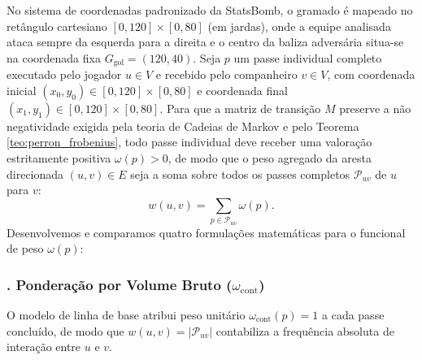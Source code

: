 \documentclass[10pt,a4paper]{article}
\theoremstyle{definition}
\theoremstyle{plain}
\theoremstyle{remark}
\begin{document}
No sistema de coordenadas padronizado da StatsBomb, o gramado é mapeado no retângulo cartesiano $[0, 120] \times [0, 80]$ (em jardas), onde a equipe analisada ataca sempre da esquerda para a direita e o centro da baliza adversária situa-se na coordenada fixa $G_{\text{gol}} = (120, 40)$. Seja $p$ um passe individual completo executado pelo jogador $u \in V$ e recebido pelo companheiro $v \in V$, com coordenada inicial $(x_0, y_0) \in [0, 120] \times [0, 80]$ e coordenada final $(x_1, y_1) \in [0, 120] \times [0, 80]$. Para que a matriz de transição $M$ preserve a não negatividade exigida pela teoria de Cadeias de Markov e pelo Teorema \ref{teo:perron_frobenius}, todo passe individual deve receber uma valoração estritamente positiva $\omega(p) > 0$, de modo que o peso agregado da aresta direcionada $(u, v) \in E$ seja a soma sobre todos os passes completos $\mathcal{P}_{uv}$ de $u$ para $v$:
\begin{equation}
w(u, v) = \sum_{p \in \mathcal{P}_{uv}} \omega(p).
\label{eq:soma_arestas}
\end{equation}
Desenvolvemos e comparamos quatro formulações matemáticas para o funcional de peso $\omega(p)$:

\subsubsection*{. Ponderação por Volume Bruto (\texorpdfstring{$\omega_{\text{cont}}$}{w\_cont})}
O modelo de linha de base atribui peso unitário $\omega_{\text{cont}}(p) = 1$ a cada passe concluído, de modo que $w(u, v) = |\mathcal{P}_{uv}|$ contabiliza a frequência absoluta de interação entre $u$ e $v$.
\end{document}
